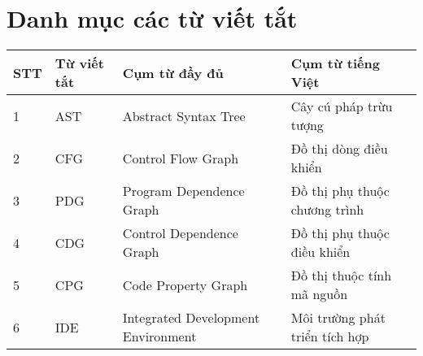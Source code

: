 \chapter*{Danh mục các từ viết tắt}

\begin{table}[h]
\begin{tabularx}{\textwidth}{|l|l|X|X|}
\hline
\textbf{STT} & \textbf{Từ viết tắt} & \textbf{Cụm từ đầy đủ} & \textbf{Cụm từ tiếng Việt} \\
\hline
1 & AST & Abstract Syntax Tree & Cây cú pháp trừu tượng \\
\hline
2 & CFG & Control Flow Graph & Đồ thị dòng điều khiển \\
\hline
3 & PDG & Program Dependence Graph & Đồ thị phụ thuộc chương trình \\
\hline
4 & CDG & Control Dependence Graph & Đồ thị phụ thuộc điều khiển \\
\hline
5 & CPG & Code Property Graph & Đồ thị thuộc tính mã nguồn \\
\hline
6 & IDE & Integrated Development Environment & Môi trường phát triển tích hợp \\
\hline
\end{tabularx}
\end{table}